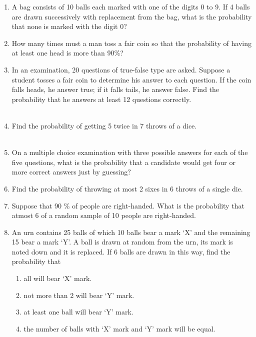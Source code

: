 \begin{enumerate}[label=\thesection.\arabic*,ref=\thesection.\theenumi]

\item A bag consists of 10 balls each marked with one of the digits 0 to 9. If 4 balls are drawn successively with replacement from the bag, what is the probability that none is marked with the digit 0?
\\
\solution

\item How many times must a man toss a fair coin so that the probability of having at least one head is more than 90\%?
\\

\item In an examination, 20 questions of true-false type are asked. Suppose a student tosses a fair coin to determine his answer to each question. If the coin falls heads, he answer true; if it falls tails, he answer false. Find the probability that he answers at least 12 questions correctly.\\
\\
\solution

\item Find the probability of getting 5 twice in 7 throws of a dice.\\
\\
\solution

\item On a multiple choice examination with three possible answers for each of the five questions, what is the probability that a candidate would get four or more correct answers just by guessing$?$
\\
\solution

\item Find the probability of throwing at most 2 sixes in 6 throws of a single die.\\
\solution

\item Suppose that 90 \% of people are right-handed. What is the probability that atmost 6 of a random sample of 10 people are right-handed. 
\\
\solution

  \item An urn contains 25 balls of which 10 balls bear a mark `X' and the 
    remaining 15 bear a mark `Y'. A ball is drawn at random from the urn, its 
    mark is noted down and it is replaced. If 6 balls are drawn in this way, 
    find the probability that 
    \begin{enumerate}
        \item all will bear `X' mark. 
        \item not more than 2 will bear `Y' mark. 
        \item at least one ball will bear `Y' mark. 
        \item the number of balls with `X' mark and `Y' mark will be equal.
    \end{enumerate}
\solution



\end{enumerate}
